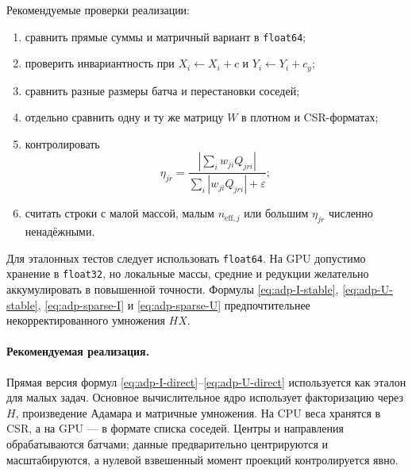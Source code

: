 Рекомендуемые проверки реализации:
\begin{enumerate}
\item сравнить прямые суммы и матричный вариант в \texttt{float64};
\item проверить инвариантность при $X_i\leftarrow X_i+c$ и
      $Y_i\leftarrow Y_i+c_y$;
\item сравнить разные размеры батча и перестановки соседей;
\item отдельно сравнить одну и ту же матрицу $W$ в плотном и CSR-форматах;
\item контролировать
\[
\eta_{jr}=
\frac{|\sum_iw_{ji}Q_{jri}|}
     {\sum_i|w_{ji}Q_{jri}|+\varepsilon};
\]
\item считать строки с малой массой, малым $n_{\mathrm{eff},j}$ или большим
      $\eta_{jr}$ численно ненадёжными.
\end{enumerate}
Для эталонных тестов следует использовать \texttt{float64}. На GPU допустимо хранение
в \texttt{float32}, но локальные массы, средние и редукции желательно аккумулировать
в повышенной точности. Формулы \eqref{eq:adp-I-stable},
\eqref{eq:adp-U-stable}, \eqref{eq:adp-sparse-I} и
\eqref{eq:adp-sparse-U} предпочтительнее некорректированного умножения $HX$.

\paragraph{Рекомендуемая реализация.}
Прямая версия формул \eqref{eq:adp-I-direct}--\eqref{eq:adp-U-direct}
используется как эталон для малых задач. Основное вычислительное ядро использует
факторизацию через $H$, произведение Адамара и матричные умножения. На CPU веса
хранятся в CSR, а на GPU --- в формате списка соседей. Центры и направления
обрабатываются батчами; данные предварительно центрируются и масштабируются, а
нулевой взвешенный момент проекций контролируется явно.
